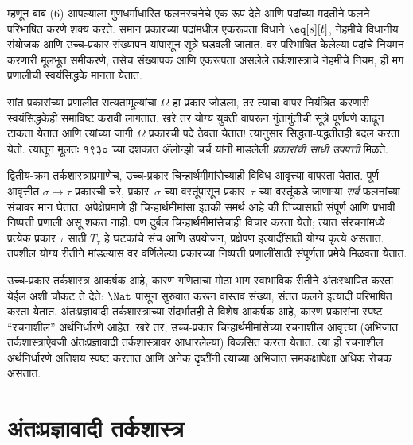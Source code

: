 म्हणून बाब (6) आपल्याला गुणधर्माधारित फलनरचनेचे एक रूप देते आणि
पदांच्या मदतीने फलने परिभाषित करणे शक्य करते. समान प्रकारच्या पदांमधील
एकरूपता विधाने $\eq[s][t]$, नेहमीचे विधानीय संयोजक आणि उच्च-प्रकार
संख्यापन यांपासून सूत्रे घडवली जातात. वर परिभाषित केलेल्या पदांचे
नियमन करणारी मूलभूत समीकरणे, तसेच संख्यापक आणि एकरूपता असलेले
तर्कशास्त्राचे नेहमीचे नियम, ही मग प्रणालीची स्वयंसिद्धके मानता येतात.

सांत प्रकारांच्या प्रणालीत सत्यतामूल्यांचा $\Omega$ हा प्रकार जोडला, तर
त्याचा वापर नियंत्रित करणारी स्वयंसिद्धकेही समाविष्ट करावी लागतात. खरे तर
योग्य युक्ती वापरून गुंतागुंतीची सूत्रे पूर्णपणे काढून टाकता येतात आणि
त्यांच्या जागी $\Omega$ प्रकारची पदे ठेवता येतात!{} त्यानुसार सिद्धता-पद्धतीतही
बदल करता येतो. त्यातून मूलतः १९३० च्या दशकात ॲलोन्झो चर्च यांनी मांडलेली
\emph{प्रकारांची साधी उपपत्ती} मिळते.

द्वितीय-क्रम तर्कशास्त्राप्रमाणेच, उच्च-प्रकार चिन्हार्थमीमांसेच्याही विविध
आवृत्त्या वापरता येतात. पूर्ण आवृत्तीत $\sigma \to \tau$ प्रकारची चरे,
प्रकार~$\sigma$ च्या वस्तूंपासून प्रकार~$\tau$ च्या वस्तूंकडे जाणाऱ्या
\emph{सर्व} फलनांच्या संचावर मान घेतात. अपेक्षेप्रमाणे ही चिन्हार्थमीमांसा
इतकी समर्थ आहे की तिच्यासाठी संपूर्ण आणि प्रभावी निष्पत्ती प्रणाली
असू शकत नाही. पण दुर्बल चिन्हार्थमीमांसेचाही विचार करता येतो; त्यात
संरचनांमध्ये प्रत्येक प्रकार $\tau$ साठी $T_\tau$ हे घटकांचे संच
आणि उपयोजन, प्रक्षेपण इत्यादींसाठी योग्य कृत्ये असतात. तपशील योग्य रीतीने
मांडल्यास वर वर्णिलेल्या प्रकारच्या निष्पत्ती प्रणालींसाठी संपूर्णता
प्रमेये मिळवता येतात.

उच्च-प्रकार तर्कशास्त्र आकर्षक आहे, कारण गणिताचा मोठा भाग स्वाभाविक रीतीने
अंतःस्थापित करता येईल अशी चौकट ते देते: $\Nat$ पासून सुरुवात करून वास्तव
संख्या, संतत फलने इत्यादी परिभाषित करता येतात. अंतःप्रज्ञावादी तर्कशास्त्राच्या
संदर्भातही ते विशेष आकर्षक आहे, कारण प्रकारांना स्पष्ट “रचनाशील” अर्थनिर्धारणे
आहेत. खरे तर, उच्च-प्रकार चिन्हार्थमीमांसेच्या रचनाशील आवृत्त्या
(अभिजात तर्कशास्त्राऐवजी अंतःप्रज्ञावादी तर्कशास्त्रावर आधारलेल्या) विकसित
करता येतात. त्या ही रचनाशील अर्थनिर्धारणे अतिशय स्पष्ट करतात आणि अनेक
दृष्टींनी त्यांच्या अभिजात समकक्षांपेक्षा अधिक रोचक असतात.












\section{अंतःप्रज्ञावादी तर्कशास्त्र}\label{fol:byd:il:sec}

